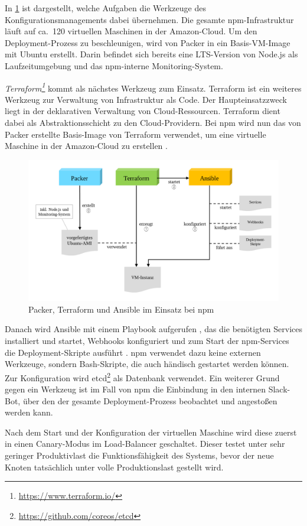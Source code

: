 In \cref{fig:configurationtools-npm} ist dargestellt, welche Aufgaben die Werkzeuge des Konfigurationsmanagements dabei übernehmen.
Die gesamte npm-Infrastruktur läuft auf ca.\ 120 virtuellen Maschinen in der Amazon-Cloud.
Um den Deployment-Prozess zu beschleunigen, wird von Packer in  ein Basis-VM-Image mit Ubuntu erstellt.
Darin befindet sich bereits eine LTS-Version von Node.js als Laufzeitumgebung und das npm-interne Monitoring-System.

\emph{Terraform\footnote{\url{https://www.terraform.io/}}} kommt als nächstes Werkzeug zum Einsatz.
Terraform ist ein weiteres Werkzeug zur Verwaltung von Infrastruktur als Code.
Der Haupteinsatzzweck liegt in der deklarativen Verwaltung von Cloud-Ressourcen.
Terraform dient dabei als Abstraktionsschicht zu den Cloud-Providern.
Bei npm wird nun das von Packer erstellte Basis-Image von Terraform verwendet, um eine virtuelle Maschine in der Amazon-Cloud zu erstellen .

\begin{figure}[htbp]
    \centering
    \includegraphics[width=0.9\linewidth,clip]{images/npm-deployment}
    \caption{Packer, Terraform und Ansible im Einsatz bei npm}
\label{fig:configurationtools-npm}
\end{figure}

Danach wird Ansible mit einem Playbook aufgerufen , das die benötigten Services installiert und startet, Webhooks konfiguriert und zum Start der npm-Services die Deployment-Skripte ausführt .
npm verwendet dazu keine externen Werkzeuge, sondern Bash-Skripte, die auch händisch gestartet werden können.
Zur Konfiguration wird etcd\footnote{\url{https://github.com/coreos/etcd}} als Datenbank verwendet.
Ein weiterer Grund gegen ein Werkzeug ist im Fall von npm die Einbindung in den internen Slack-Bot, über den der gesamte Deployment-Prozess beobachtet und angestoßen werden kann.

Nach dem Start und der Konfiguration der virtuellen Maschine wird diese zuerst in einen Canary-Modus im Load-Balancer geschaltet.
Dieser testet unter sehr geringer Produktivlast die Funktionsfähigkeit des Systems, bevor der neue Knoten tatsächlich unter volle Produktionslast gestellt wird.
